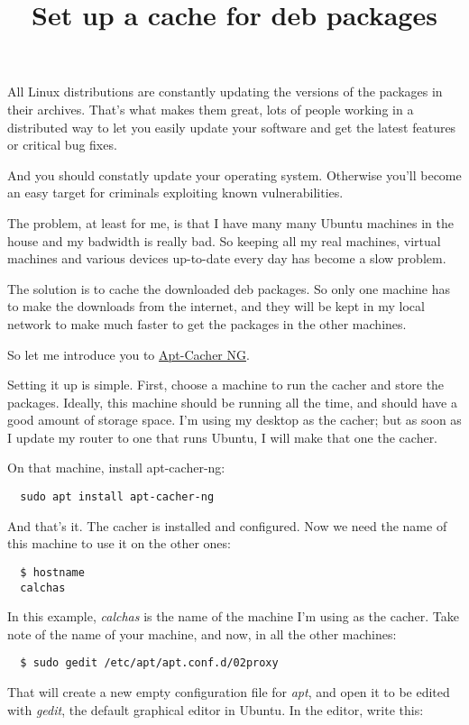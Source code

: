 \documentclass[12pt]{article}
\title{Set up a cache for deb packages}
\begin{document}
All Linux distributions are constantly updating the versions of the packages in
their archives. That's what makes them great, lots of people working in a
distributed way to let you easily update your software and get the latest
features or critical bug fixes.

And you should constatly update your operating system. Otherwise you'll become
an easy target for criminals exploiting known vulnerabilities.

The problem, at least for me, is that I have many many Ubuntu machines in the
house and my badwidth is really bad. So keeping all my real machines, virtual
machines and various devices up-to-date every day has become a slow problem.

The solution is to cache the downloaded deb packages. So only one machine has
to make the downloads from the internet, and they will be kept in my local
network to make much faster to get the packages in the other machines.

So let me introduce you to
\href{https://www.unix-ag.uni-kl.de/~bloch/acng/}{Apt-Cacher NG}.

Setting it up is simple. First, choose a machine to run the cacher and store
the packages. Ideally, this machine should be running all the time, and should
have a good amount of storage space. I'm using my desktop as the cacher; but as
soon as I update my router to one that runs Ubuntu, I will make that one the
cacher.

On that machine, install apt-cacher-ng:

\begin{verbatim}
  sudo apt install apt-cacher-ng
\end{verbatim}

And that's it. The cacher is installed and configured. Now we need the name
of this machine to use it on the other ones:

\begin{verbatim}
  $ hostname
  calchas
\end{verbatim}

In this example, \emph{calchas} is the name of the machine I'm using as the
cacher. Take note of the name of your machine, and now, in all the other
machines:

\begin{verbatim}
  $ sudo gedit /etc/apt/apt.conf.d/02proxy
\end{verbatim}

That will create a new empty configuration file for \emph{apt}, and open it to
be edited with \emph{gedit}, the default graphical editor in Ubuntu. In the
editor, write this:
\end{document}

